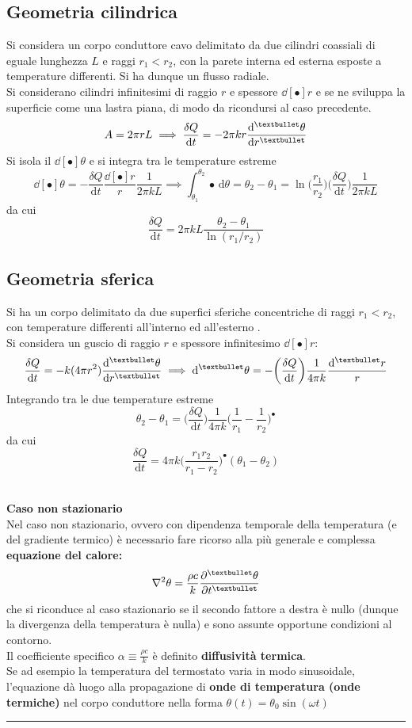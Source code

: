 \documentclass[10pt, oneside]{book}
\newcommand{\infobox}[2]{\vspace{0.5cm}~\\ \textbf{#1} \hrulefill \vspace{0.2cm}\\#2 {}\,\\\hrule \vspace{0.5cm}}
\newcommand{\ds}{\displaystyle}
\newcommand{\integral}[4]{\int_{#1}^{#2} #3 \, \mathrm{d}#4}
\begin{document}
\subsection{Geometria cilindrica}
Si considera un corpo conduttore cavo delimitato da due cilindri coassiali di eguale lunghezza $L$ e raggi $r_1 < r_2$, con la parete interna ed esterna esposte a temperature differenti. Si ha dunque un flusso radiale.\\
Si considerano cilindri infinitesimi di raggio $r$ e spessore $\dd[•]{r}$ e se ne sviluppa la superficie come una lastra piana, di modo da ricondursi al caso precedente.\\
\[A = 2 \pi r L \implies \frac{\delta Q}{\mathrm{d} t} = -2\pi k r \dv[•]{\theta}{r}\]
Si isola il $\dd[•]{\theta}$ e si integra tra le temperature estreme
\[\dd[•]{\theta} = - \frac{\delta Q}{\mathrm{d} t} \frac{\dd[•]{r}}{r} \frac{1}{2 \pi k L} \implies \integral{\theta_1}{\theta_2}{•}{\theta} = \theta_2 - \theta_1 = \ln \bigg( \frac{r_1}{r_2} \bigg) \bigg(\frac{\delta Q}{\mathrm{d} t}\bigg) \frac{1}{2 \pi k L}\]
da cui
\[\boxed{\frac{\delta Q}{\mathrm{d} t} = 2 \pi k L \frac{\theta_2 - \theta_1}{\ln (r_1 \big/ r_2)}}\]

\subsection{Geometria sferica}
Si ha un corpo delimitato da due superfici sferiche concentriche di raggi $r_1 < r_2$, con temperature differenti all'interno ed all'esterno .\\
Si considera un guscio di raggio $r$ e spessore infinitesimo $\dd[•]{r}$:
\[\frac{\delta Q}{\mathrm{d} t} = - k (4 \pi r^2) \dv[•]{\theta}{r} \implies \dd[•]{\theta}= - \bigg(\frac{\delta Q}{\mathrm{d} t}\bigg) \frac{1}{4 \pi k} \frac{\dd[•]{r}}{r}\]
Integrando tra le due temperature estreme
\[\theta_2 - \theta_1 = \bigg(\frac{\delta Q}{\mathrm{d} t}\bigg) \frac{1}{4 \pi k} \bigg(\frac{1}{r_1} - \frac{1}{r_2}\bigg)^{•}  \]
da cui
\[\boxed{\frac{\delta Q}{\mathrm{d} t} = 4 \pi k \bigg(\frac{r_1 r_2}{r_1 - r_2}\bigg)^{•} (\theta_1 - \theta_2)}\]

\infobox{Caso non stazionario}{Nel caso non stazionario, ovvero con dipendenza temporale della temperatura (e del gradiente termico) è necessario fare ricorso alla più generale e complessa \textbf{equazione del calore:}
\[\nabla^2 \theta = \frac{\rho c}{k} \pdv[•]{\theta}{t}\]
che si riconduce al caso stazionario se il secondo fattore a destra è nullo (dunque la divergenza della temperatura è nulla) e sono assunte opportune condizioni al contorno.\\
Il coefficiente specifico $\ds \alpha \equiv \frac{\rho c}{k}$ è definito \textbf{diffusività termica}.\\
Se ad esempio la temperatura del termostato varia in modo sinusoidale, l'equazione dà luogo alla propagazione di \textbf{onde di temperatura (onde termiche)} nel corpo conduttore nella forma $\ds \theta(t) = \theta_0 \sin (\omega t)$
}
\end{document}
